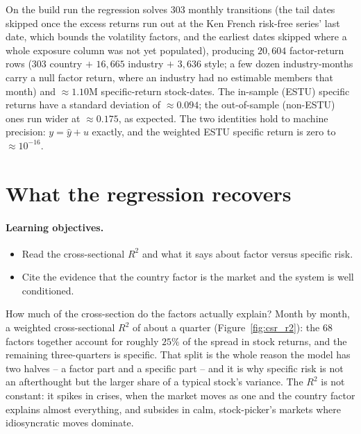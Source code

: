 \documentclass[11pt]{article}
\theoremstyle{definition}
\theoremstyle{plain}
\theoremstyle{remark}
\begin{document}
\begin{observed}
On the build run the regression solves $303$ monthly transitions (the tail dates skipped once the excess returns run out at the Ken French risk-free series' last date, which bounds the volatility factors, and the earliest dates skipped where a whole exposure column was not yet populated), producing $20{,}604$ factor-return rows ($303$ country $+$ $16{,}665$ industry $+$ $3{,}636$ style; a few dozen industry-months carry a null factor return, where an industry had no estimable members that month) and $\approx 1.10$M specific-return stock-dates. The in-sample (ESTU) specific returns have a standard deviation of $\approx 0.094$; the out-of-sample (non-ESTU) ones run wider at $\approx 0.175$, as expected. The two identities hold to machine precision: $y=\hat y+u$ exactly, and the weighted ESTU specific return is zero to $\approx 10^{-16}$.
\end{observed}

\section{What the regression recovers}\label{sec:diag}

\paragraph{Learning objectives.}
\begin{itemize}[leftmargin=1.4em,topsep=2pt]
  \item Read the cross-sectional $R^2$ and what it says about factor versus specific risk.
  \item Cite the evidence that the country factor is the market and the system is well conditioned.
\end{itemize}

How much of the cross-section do the factors actually explain? Month by month, a weighted cross-sectional $R^2$ of about a quarter (Figure~\ref{fig:csr_r2}): the $68$ factors together account for roughly $25\%$ of the spread in stock returns, and the remaining three-quarters is specific. That split is the whole reason the model has two halves -- a factor part and a specific part -- and it is why specific risk is not an afterthought but the larger share of a typical stock's variance. The $R^2$ is not constant: it spikes in crises, when the market moves as one and the country factor explains almost everything, and subsides in calm, stock-picker's markets where idiosyncratic moves dominate.
\end{document}

